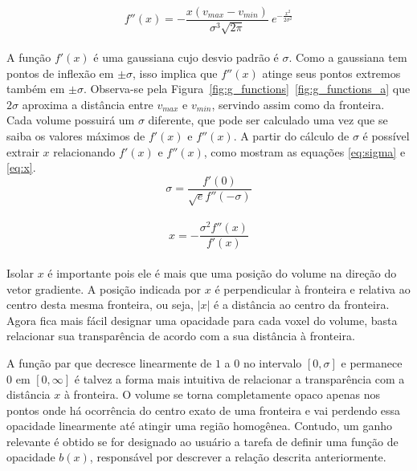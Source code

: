 \begin{equation} \label{eq:second}
	f''(x) = -\frac{x(v_{max} - v_{min})}{\sigma^{3}\sqrt{2\pi}}\ e^{-\frac{x^{2}}{2\sigma^{2}}}
\end{equation} \\

	A função $f'(x)$ é uma gaussiana cujo desvio padrão é $\sigma$. Como a gaussiana tem pontos de inflexão em $\pm\sigma$, isso implica que $f''(x)$ atinge seus pontos extremos também em $\pm\sigma$. Observa-se pela Figura~\ref{fig:g_functions}~\ref{fig:g_functions_a} que $2\sigma$ aproxima a distância entre $v_{max}$ e $v_{min}$, servindo assim como  da fronteira. Cada volume possuirá um $\sigma$ diferente, que pode ser calculado uma vez que se saiba os valores máximos de $f'(x)$ e $f''(x)$. A partir do cálculo de $\sigma$ é possível extrair $x$ relacionando $f'(x)$ e $f''(x)$, como mostram as equações \eqref{eq:sigma} e \eqref{eq:x}.
	\\
	
\begin{equation} \label{eq:sigma}
	\sigma = \frac{f'(0)}{\sqrt{e}f''(-\sigma)}
\end{equation} \\

\begin{equation} \label{eq:x}
	x = -\frac{\sigma^{2}f''(x)}{f'(x)}
\end{equation} \\

	Isolar $x$ é importante pois ele é mais que uma posição do volume na direção do vetor gradiente. A posição indicada por $x$ é perpendicular à fronteira e relativa ao centro desta mesma fronteira, ou seja, $|x|$ é a distância ao centro da fronteira. Agora fica mais fácil designar uma opacidade para cada voxel do volume, basta relacionar sua transparência de acordo com a sua distância à fronteira.
	
	A função par que decresce linearmente de $1$ a $0$ no intervalo $[0,\sigma]$ e permanece $0$ em $[0, \infty]$ é talvez a forma mais intuitiva de relacionar a transparência com a distância $x$ à fronteira. O volume se torna completamente opaco apenas nos pontos onde há ocorrência do centro exato de uma fronteira e vai perdendo essa opacidade linearmente até atingir uma região homogênea. Contudo, um ganho relevante é obtido se for designado ao usuário a tarefa de definir uma função de opacidade $b(x)$, responsável por descrever a relação  descrita anteriormente.
	
